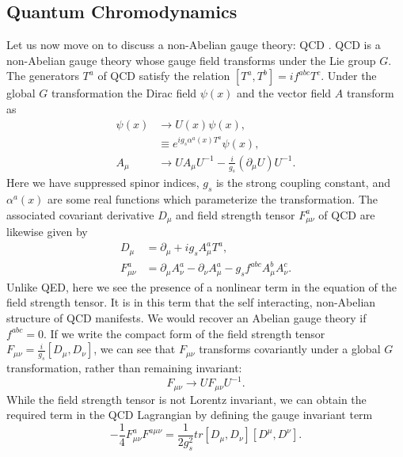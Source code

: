\subsection{Quantum Chromodynamics}
Let us now move on to discuss a non-Abelian gauge theory: QCD \cite{GELLMANN1964214, FRITZSCH1973365}.  QCD is a non-Abelian gauge theory whose gauge field transforms under the Lie group $G$.  The generators $T^a$ of QCD satisfy the relation $[T^a,T^b] = if^{abc}T^c$.  Under the global $G$ transformation the Dirac field $\psi(x)$ and the vector field $A$ transform as
\begin{equation}
\begin{split}
     \psi(x) &\rightarrow U(x) \psi(x), \\
     &\equiv e^{ig_s\alpha^a(x)T^a}\psi(x),\\
     A_\mu &\rightarrow U A_\mu U^{−1} - \frac{i}{g_s} (\partial_\mu U)U^{−1}.
\end{split}
\end{equation}
Here we have suppressed spinor indices, $g_s$ is the strong coupling constant, and $\alpha^a(x)$ are some real functions which parameterize the transformation.  %
%
The associated covariant derivative $D_\mu$ and field strength tensor $F_{\mu\nu}^a$ of QCD are likewise given by 
\begin{equation}\label{eq:QCD_partial}
\begin{split}
        D_\mu &= \partial_\mu + ig_sA^a_\mu T^a,\\
        F^a_{\mu\nu} &= \partial_\mu A^a_\nu - \partial_\nu A^a_\mu - g_sf^{abc}A^b_\mu A^c_\nu.
\end{split}
\end{equation}
Unlike QED, here we see the presence of a nonlinear term in the equation of the field strength tensor.  It is in this term that the self interacting, non-Abelian structure of QCD manifests.  We would recover an Abelian gauge theory if $f^{abc}=0$.  If we write the compact form of the field strength tensor $F_{\mu\nu} = \frac{i}{g_s}[D_\mu,D_\nu]$, we can see that $F_{\mu\nu}$ transforms covariantly under a global $G$ transformation, rather than remaining invariant:
\begin{equation}\label{eq:Fmunu_transform}
    F_{\mu\nu} \rightarrow UF_{\mu\nu}U^{-1}.
\end{equation}
While the field strength tensor is not Lorentz invariant,  we can obtain the required term in the QCD Lagrangian by defining the gauge invariant term
\begin{equation}\label{eq:QCD_gauge_invariant}
    -\frac{1}{4}F^a_{\mu\nu}F^{a\mu\nu} = \frac{1}{2g_s^2}tr[D_\mu, D_\nu][D^\mu, D^\nu].
\end{equation}

